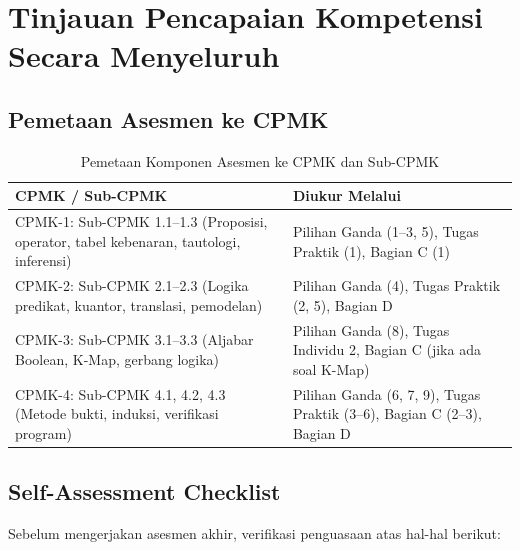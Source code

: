 \section{Tinjauan Pencapaian Kompetensi Secara Menyeluruh}

\subsection{Pemetaan Asesmen ke CPMK}

\begin{table}[H]
\centering
\begin{tabular}{|>{\raggedright\arraybackslash}p{5cm}|>{\raggedright\arraybackslash}p{8cm}|}
\hline
\textbf{CPMK / Sub-CPMK} & \textbf{Diukur Melalui} \\
\hline
CPMK-1: Sub-CPMK 1.1--1.3 (Proposisi, operator, tabel kebenaran, tautologi, inferensi) & Pilihan Ganda (1--3, 5), Tugas Praktik (1), Bagian C (1) \\
\hline
CPMK-2: Sub-CPMK 2.1--2.3 (Logika predikat, kuantor, translasi, pemodelan) & Pilihan Ganda (4), Tugas Praktik (2, 5), Bagian D \\
\hline
CPMK-3: Sub-CPMK 3.1--3.3 (Aljabar Boolean, K-Map, gerbang logika) & Pilihan Ganda (8), Tugas Individu 2, Bagian C (jika ada soal K-Map) \\
\hline
CPMK-4: Sub-CPMK 4.1, 4.2, 4.3 (Metode bukti, induksi, verifikasi program) & Pilihan Ganda (6, 7, 9), Tugas Praktik (3--6), Bagian C (2--3), Bagian D \\
\hline
\end{tabular}
\caption{Pemetaan Komponen Asesmen ke CPMK dan Sub-CPMK}
\end{table}

\subsection{Self-Assessment Checklist}

Sebelum mengerjakan asesmen akhir, verifikasi penguasaan atas hal-hal berikut:

